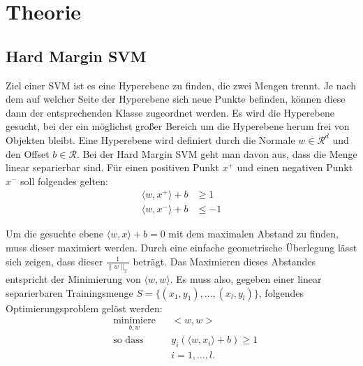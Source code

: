 \documentclass{scrartcl}
\begin{document}
\section{Theorie}
\subsection{Hard Margin SVM}
Ziel einer SVM ist es eine Hyperebene zu finden, die zwei Mengen trennt.
Je nach dem auf welcher Seite der Hyperebene sich neue Punkte befinden, können diese dann der entsprechenden Klasse zugeordnet werden.
Es wird die Hyperebene gesucht, bei der ein möglichst großer Bereich um die Hyperebene herum frei von Objekten bleibt.
Eine Hyperebene wird definiert durch die Normale $w \in \mathcal R^d$ und den Offset $b \in \mathcal R$.
Bei der Hard Margin SVM geht man davon aus, dass die Menge linear separierbar sind.
Für einen positiven Punkt $x^+$ und einen negativen Punkt $x^-$ soll folgendes gelten:
\begin{align}
\langle w , x^+ \rangle + b &\ge 1 \\
\langle w , x^- \rangle + b &\le -1 
\end{align}

Um die gesuchte ebene $\langle w,x \rangle + b = 0$ mit dem maximalen Abstand zu finden, muss dieser maximiert werden.
Durch eine einfache geometrische Überlegung lässt sich zeigen, dass dieser $\frac{1}{\|w\|_2}$ beträgt. Das Maximieren dieses Abstandes entspricht der Minimierung von $\langle w,w \rangle$.
Es muss also, gegeben einer linear separierbaren Trainingsmenge $S = \lbrace(x_1, y_1),\ldots ,(x_l, y_l)\rbrace$, folgendes Optimierungsproblem gelöst werden:
\begin{align}
& \underset{b,w}{\text{minimiere}}& &<w,w> \\
& \text{so dass } & & y_i \left( \langle w , x_i \rangle + b \right) \geq 1 \nonumber \\
& & &i = 1, \ldots, l. \nonumber
\end{align}
\end{document}

